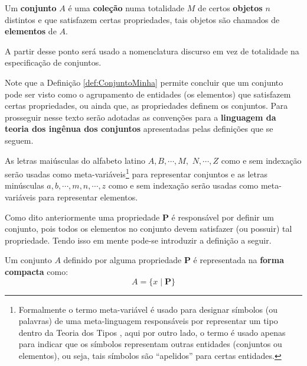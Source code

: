 \begin{definition}\label{def:ConjuntoMinha}
	Um \textbf{conjunto} $A$ é uma \textbf{coleção} numa totalidade $M$ de certos \textbf{objetos} $n$ distintos e que satisfazem certas propriedades, tais objetos são chamados de \textbf{elementos} de $A$.
\end{definition}

\begin{rema}
	A partir desse ponto será usado a nomenclatura discurso em vez de totalidade na especificação de conjuntos.
\end{rema}

Note que a Definição \ref{def:ConjuntoMinha} permite concluir que um conjunto pode ser visto como o agrupamento de entidades (os elementos) que satisfazem certas propriedades, ou ainda que, as propriedades definem os conjuntos. Para prosseguir nesse texto serão adotadas as convenções para a \textbf{linguagem da teoria dos ingênua dos conjuntos} apresentadas pelas definições que se seguem.

\begin{definition}\label{def:NotacaoConjuntos1}
	As letras maiúsculas do alfabeto latino $A, B, \cdots, M,$ $N, \cdots, Z$ como e sem indexação serão usadas como meta-variáveis\footnote{Formalmente o termo meta-variável é usado para designar símbolos (ou palavras) de uma meta-linguagem responsáveis por representar um tipo dentro da Teoria dos Tipos \cite{sato2003}, aqui por outro lado, o termo é usado apenas para indicar que os símbolos representam outras entidades (conjuntos ou elementos), ou seja, tais símbolos são ``apelidos'' para certas entidades.} para representar conjuntos e as letras minúsculas $a, b, \cdots, m, n, \cdots, z$ como e sem indexação serão usadas como meta-variáveis para representar elementos.
\end{definition}

Como dito anteriormente uma propriedade $\textbf{P}$ é responsável por definir um conjunto, pois todos os elementos no conjunto devem satisfazer (ou possuir) tal propriedade. Tendo isso em mente pode-se introduzir a definição a seguir.

\begin{definition}\label{def:NotacaoCompacta}
	Um conjunto $A$ definido por alguma propriedade $\textbf{P}$ é representada na \textbf{forma compacta} como:
	\begin{equation}
		A = \{ x \mid \textbf{P}\}
	\end{equation}
\end{definition}


